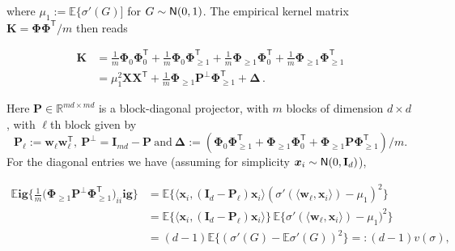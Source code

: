   where $\mu_1:= \mathbb{E}\{\sigma'(G)]$ for $G\sim{\sf N}(0,1)$. The empirical kernel matrix
  ${\boldsymbol K} = {\boldsymbol \Phi}{\boldsymbol \Phi}^{{\mathsf T}}/m$ then reads

  \begin{align}
    {\boldsymbol K} & =\frac{1}{m} {\boldsymbol \Phi}_0{\boldsymbol \Phi}_0^{{\mathsf T}}+\frac{1}{m} {\boldsymbol \Phi}_0{\boldsymbol \Phi}_{\ge 1}^{{\mathsf T}}+\frac{1}{m} {\boldsymbol \Phi}_{\ge 1}{\boldsymbol \Phi}_0^{{\mathsf T}}+\frac{1}{m} {\boldsymbol \Phi}_{\ge 1}{\boldsymbol \Phi}_{\ge 1}^{{\mathsf T}}\\
        & = \mu_1^2{\boldsymbol X}{\boldsymbol X}^{{\mathsf T}}+\frac{1}{m} {\boldsymbol \Phi}_{\ge 1}{\boldsymbol P}^{\perp}{\boldsymbol \Phi}_{\ge 1}^{{\mathsf T}}+{\boldsymbol \Delta}\, .
          \label{eq:DecompositionNTK}
  \end{align}

  Here ${\boldsymbol P}\in{\mathbb R}^{md\times md}$ is a block-diagonal projector, with $m$ blocks of dimension $d\times d$, with $\ell$th block given by 
  $${\boldsymbol P}_{\ell}:={\boldsymbol w}_{\ell}{\boldsymbol w}^{{\mathsf T}}_{\ell},~ {\boldsymbol P}^{\perp} = {\mathbf I}_{md}-{\boldsymbol P} ~\text{and}~
  {\boldsymbol \Delta} := ({\boldsymbol \Phi}_0{\boldsymbol \Phi}_{\ge 1}^{{\mathsf T}}+{\boldsymbol \Phi}_{\ge 1}{\boldsymbol \Phi}_0^{{\mathsf T}}+ {\boldsymbol \Phi}_{\ge 1}{\boldsymbol P}{\boldsymbol \Phi}_{\ge 1}^{{\mathsf T}})/m.$$ For the diagonal entries we have (assuming for simplicity
   ${\boldsymbol x}_i\sim{\sf N}(0,{\mathbf I}_d)$), 

  \begin{align*}
    \mathbb{E}\mathbf{ig}\{\frac{1}{m} \big({\boldsymbol \Phi}_{\ge 1}{\boldsymbol P}^{\perp}{\boldsymbol \Phi}_{\ge 1}^{{\mathsf T}}\big)_{ii}\mathbf{ig}\} &=
                                                                                           \mathbb{E}\big\{\langle{\boldsymbol x}_i,({\mathbf I}_d-{\boldsymbol P}_{\ell}){\boldsymbol x}_i\rangle
                                                                                           (\sigma'(\langle{\boldsymbol w}_{\ell},{\boldsymbol x}_i\rangle)-\mu_1)^2\big\}\\
                                                                                         &=\mathbb{E}\big\{\langle{\boldsymbol x}_i,({\mathbf I}_d-{\boldsymbol P}_{\ell}){\boldsymbol x}_i\rangle \big\}\,\mathbb{E}\big\{ \sigma'(\langle{\boldsymbol w}_{\ell},{\boldsymbol x}_i\rangle)-\mu_1)^2\big\}\\
                                                                                         & = (d-1)\mathbb{E}\{(\sigma'(G)-\mathbb{E}\sigma'(G))^2\}=: (d-1)v(\sigma),
  \end{align*}


